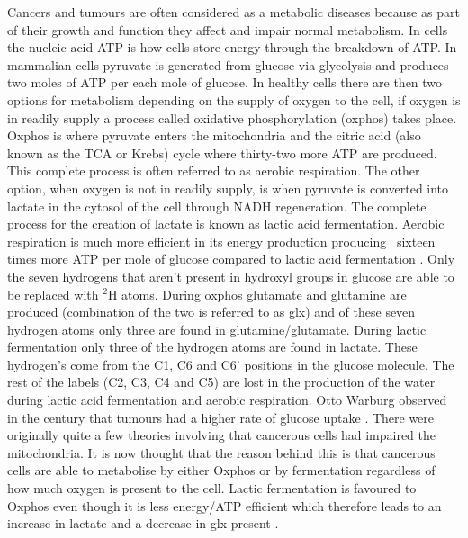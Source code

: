 Cancers and tumours are often considered as a metabolic diseases because as part of their growth and function they affect and impair normal metabolism. In cells the nucleic acid \ac{ATP} is how cells store energy through the breakdown of \ac{ATP}. In mammalian cells pyruvate is generated from glucose via glycolysis and produces two moles of \ac{ATP} per each mole of glucose. In healthy cells there are then two options for metabolism depending on the supply of oxygen to the cell, if oxygen is in readily supply a process called oxidative phosphorylation (oxphos) takes place. Oxphos is where pyruvate enters the mitochondria and the citric acid (also known as the \ac{TCA} or Krebs) cycle where thirty-two more \ac{ATP} are produced. This complete process is often referred to as aerobic respiration. The other option, when oxygen is not in readily supply, is when pyruvate is converted into lactate in the cytosol of the cell through NADH regeneration. The complete process for the creation of lactate is known as lactic acid fermentation. Aerobic respiration is much more efficient in its energy production producing ~sixteen times more \ac{ATP} per mole of glucose compared to lactic acid fermentation \cite{Romero-Garcia2011TumorView}. Only the seven hydrogens that aren't present in hydroxyl groups in glucose are able to be replaced with $^2$H atoms. During oxphos glutamate and glutamine are produced (combination of the two is referred to as glx) and of these seven hydrogen atoms only three are found in glutamine/glutamate. During lactic fermentation only three of the hydrogen atoms are found in lactate. These hydrogen's come from the C1, C6 and C6' positions in the glucose molecule. The rest of the labels (C2, C3, C4 and C5) are lost in the production of the water during lactic acid fermentation and aerobic respiration. Otto Warburg observed in the  century that tumours had a higher rate of glucose uptake \cite{WarburgBerlin-Dahlem1925TheCells,Warburg1956OnCells}. There were originally quite a few theories involving that cancerous cells had impaired the mitochondria. It is now thought that the reason behind this is that cancerous cells are able to metabolise by either Oxphos or by fermentation regardless of how much oxygen is present to the cell. Lactic fermentation is favoured to Oxphos even though it is less energy/\ac{ATP} efficient which therefore leads to an increase in lactate and a decrease in glx present \cite{Romero-Garcia2011TumorView}.

